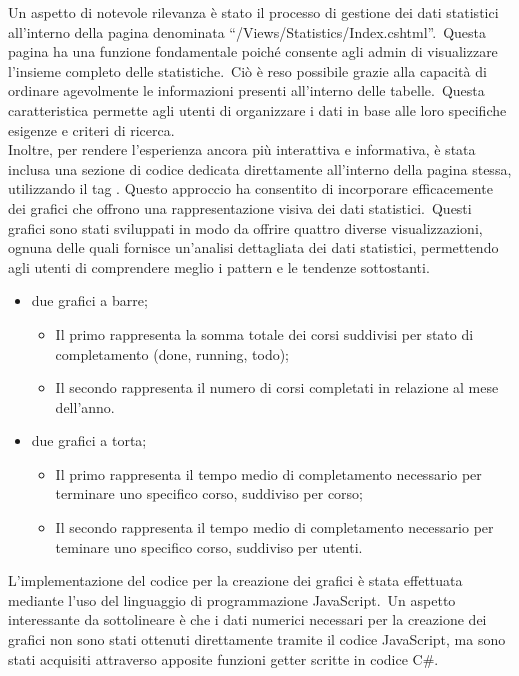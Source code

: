 Un aspetto di notevole rilevanza è stato il processo di gestione dei dati statistici all'interno della pagina denominata 
``/Views/Statistics/Index.cshtml''.\ Questa pagina ha una funzione fondamentale poiché consente agli admin di visualizzare 
l'insieme completo delle statistiche.\ Ciò è reso possibile grazie alla capacità di ordinare agevolmente le informazioni 
presenti all'interno delle tabelle.\ Questa caratteristica permette agli utenti di organizzare i dati in base alle loro 
specifiche esigenze e criteri di ricerca.
\\
Inoltre, per rendere l'esperienza ancora più interattiva e informativa, è stata inclusa una sezione di codice dedicata 
direttamente all'interno della pagina stessa, utilizzando il tag . Questo approccio ha 
consentito di incorporare efficacemente dei grafici che offrono una rappresentazione visiva dei dati statistici.\ 
Questi grafici sono stati sviluppati in modo da offrire quattro diverse visualizzazioni, ognuna delle quali fornisce un'analisi 
dettagliata dei dati statistici, permettendo agli utenti di comprendere meglio i pattern e le tendenze sottostanti.
\begin{itemize}
	\item due grafici a barre;
	\begin{itemize}
		\item Il primo rappresenta la somma totale dei corsi suddivisi per stato di completamento (done, running, todo);
		\item Il secondo rappresenta il numero di corsi completati in relazione al mese dell'anno.
	\end{itemize}
	\item due grafici a torta;
	\begin{itemize}
		\item Il primo rappresenta il tempo medio di completamento necessario per terminare uno specifico corso, suddiviso per corso;
		\item Il secondo rappresenta il tempo medio di completamento necessario per teminare uno specifico corso, suddiviso per utenti.
	\end{itemize}
\end{itemize}
L'implementazione del codice per la creazione dei grafici è stata effettuata mediante l'uso del linguaggio di programmazione JavaScript.\ 
Un aspetto interessante da sottolineare è che i dati numerici necessari per la creazione dei grafici non sono stati ottenuti direttamente 
tramite il codice JavaScript, ma sono stati acquisiti attraverso apposite funzioni getter scritte in codice C\#.\ 
